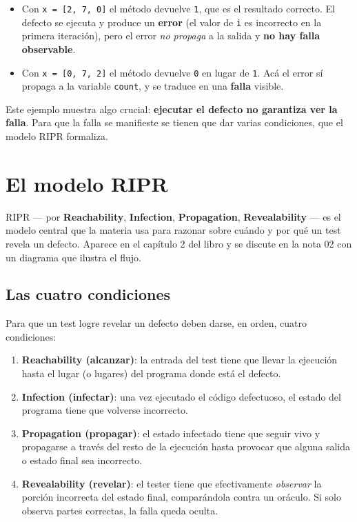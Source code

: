 \documentclass[12pt,a4paper]{article}
\begin{document}
\begin{itemize}
  \item Con \texttt{x = [2, 7, 0]} el método devuelve \texttt{1}, que es el resultado correcto. El defecto se ejecuta y produce un \textbf{error} (el valor de \texttt{i} es incorrecto en la primera iteración), pero el error \textit{no propaga} a la salida y \textbf{no hay falla observable}.
  \item Con \texttt{x = [0, 7, 2]} el método devuelve \texttt{0} en lugar de \texttt{1}. Acá el error sí propaga a la variable \texttt{count}, y se traduce en una \textbf{falla} visible.
\end{itemize}

Este ejemplo muestra algo crucial: \textbf{ejecutar el defecto no garantiza ver la falla}. Para que la falla se manifieste se tienen que dar varias condiciones, que el modelo RIPR formaliza.

\section{El modelo RIPR}
RIPR --- por \textbf{Reachability}, \textbf{Infection}, \textbf{Propagation}, \textbf{Revealability} --- es el modelo central que la materia usa para razonar sobre cuándo y por qué un test revela un defecto. Aparece en el capítulo 2 del libro y se discute en la nota 02 con un diagrama que ilustra el flujo.

\subsection{Las cuatro condiciones}
Para que un test logre revelar un defecto deben darse, en orden, cuatro condiciones:

\begin{enumerate}
  \item \textbf{Reachability (alcanzar)}: la entrada del test tiene que llevar la ejecución hasta el lugar (o lugares) del programa donde está el defecto.
  \item \textbf{Infection (infectar)}: una vez ejecutado el código defectuoso, el estado del programa tiene que volverse incorrecto.
  \item \textbf{Propagation (propagar)}: el estado infectado tiene que seguir vivo y propagarse a través del resto de la ejecución hasta provocar que alguna salida o estado final sea incorrecto.
  \item \textbf{Revealability (revelar)}: el tester tiene que efectivamente \textit{observar} la porción incorrecta del estado final, comparándola contra un oráculo. Si solo observa partes correctas, la falla queda oculta.
\end{enumerate}
\end{document}
